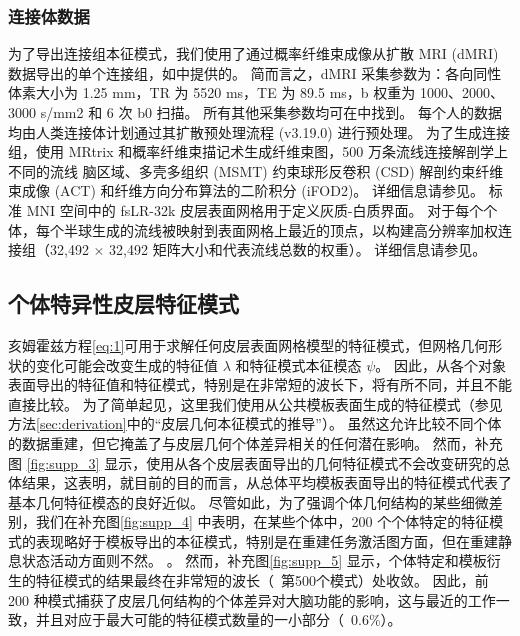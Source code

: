 \documentclass[lang=cn,a4paper,newtx]{elegantpaper}
\begin{document}
\subsubsection{连接体数据} \label{sec:sup_2_3}

为了导出连接组本征模式，我们使用了通过概率纤维束成像从扩散 MRI (dMRI) 数据导出的单个连接组，如\cite{tian2021high}中提供的。
简而言之，dMRI 采集参数为：各向同性体素大小为 1.25 mm，TR 为 5520 ms，TE 为 89.5 ms，b 权重为 1000、2000、3000 s/mm2 和 6 次 b0 扫描。
所有其他采集参数均可在\cite{van2013wu}中找到。
每个人的数据均由人类连接体计划通过其扩散预处理流程 (v3.19.0) \cite{glasser2013minimal}进行预处理。
为了生成连接组，使用 MRtrix 和概率纤维束描记术生成纤维束图，500 万条流线连接解剖学上不同的流线 脑区域、多壳多组织 (MSMT) 约束球形反卷积 (CSD) 解剖约束纤维束成像 (ACT) 和纤维方向分布算法的二阶积分 (iFOD2)。
详细信息请参见\cite{tian2021high}。
标准 MNI 空间中的 fsLR-32k 皮层表面网格用于定义灰质-白质界面。
对于每个个体，每个半球生成的流线被映射到表面网格上最近的顶点，以构建高分辨率加权连接组（32,492 × 32,492 矩阵大小和代表流线总数的权重）。
详细信息请参见\cite{tian2021high}。


\subsection{个体特异性皮层特征模式} \label{sec:individual_specific}
亥姆霍兹方程\ref{eq:1}可用于求解任何皮层表面网格模型的特征模式，但网格几何形状的变化可能会改变生成的特征值 $ \lambda $ 和特征模式本征模态 $ \psi $。
因此，从各个对象表面导出的特征值和特征模式，特别是在非常短的波长下，将有所不同，并且不能直接比较\cite{henderson2022empirical,chen2022individuality}。
为了简单起见，这里我们使用从公共模板表面生成的特征模式（参见方法\ref{sec:derivation}中的“皮层几何本征模式的推导”）。
虽然这允许比较不同个体的数据重建，但它掩盖了与皮层几何个体差异相关的任何潜在影响。
然而，补充图 \ref{fig:supp_3} 显示，使用从各个皮层表面导出的几何特征模式不会改变研究的总体结果，这表明，就目前的目的而言，从总体平均模板表面导出的特征模式代表了基本几何特征模态的良好近似。
尽管如此，为了强调个体几何结构的某些细微差别，我们在补充图\ref{fig:supp_4} 中表明，在某些个体中，200 个个体特定的特征模式的表现略好于模板导出的本征模式，特别是在重建任务激活图方面，但在重建静息状态活动方面则不然。 。 
然而，补充图\ref{fig:supp_5} 显示，个体特定和模板衍生的特征模式的结果最终在非常短的波长（~第500个模式）处收敛。
因此，前 200 种模式捕获了皮层几何结构的个体差异对大脑功能的影响，这与最近的工作\cite{chen2022individuality}一致，并且对应于最大可能的特征模式数量的一小部分（~0.6\%）。
\end{document}
